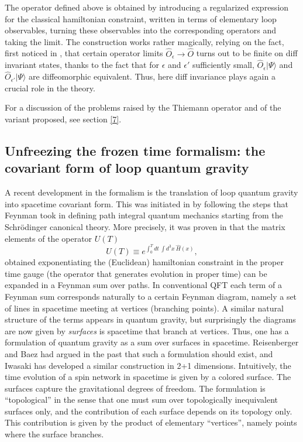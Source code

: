 \documentclass[12pt]{article}
\begin{document}
The operator defined above is obtained by introducing a 
regularized expression for the classical hamiltonian constraint, 
written in terms of elementary loop observables, turning these 
observables into the corresponding operators and taking the 
limit.  The construction works rather magically, relying on the 
fact, first noticed in \cite{RovelliSmolin94b}, that certain 
operator limits $\hat O_{\epsilon}\rightarrow \hat O$ turns out 
to be finite on diff invariant states, thanks to the fact that 
for $\epsilon$ and $\epsilon'$ sufficiently small, $\hat 
O_{\epsilon}|\Psi\rangle$ and $\hat O_{\epsilon'}|\Psi\rangle$ 
are diffeomorphic equivalent.  Thus, here diff invariance plays 
again a crucial role in the theory.

For a discussion of the problems raised by the Thiemann operator 
and of the variant proposed, see section \ref{7}. 


\subsection{Unfreezing the frozen time formalism: the 
covariant form of loop quantum gravity}\label{spacetime}

A recent development in the formalism is the translation 
of loop quantum gravity into spacetime covariant form.  This 
was initiated in \cite{RovelliSurf,ReisenbergerRovelli} by following 
the steps that Feynman took in defining path integral 
quantum mechanics starting from the Schr\"odinger canonical 
theory.  More precisely, it was proven in 
\cite{ReisenbergerRovelli} that the matrix elements of the 
operator $U(T)$ 
\begin{equation}
	U(T) \equiv e^{\int_{0}^{T}dt\ \int d^{3}x\ \hat H(x)}, 
\end{equation}
obtained exponentiating the (Euclidean) hamiltonian 
constraint in the proper time gauge (the operator that 
generates evolution in proper time) can be expanded in a 
Feynman sum over paths.  In conventional QFT each term of 
a Feynman sum corresponds naturally to a certain Feynman 
diagram, namely a set of lines in spacetime meeting at 
vertices (branching points).  A similar 
natural structure of the terms appears in quantum gravity, 
but surprisingly the diagrams are now given by {\em surfaces\/} is 
spacetime that branch at vertices.  Thus, one has a 
formulation of quantum gravity as a sum over surfaces in 
spacetime. Reisenberger \cite{Reisenberger94} and Baez 
\cite{Baez94b} had argued in the past that such a 
formulation should exist, and Iwasaki has developed a similar 
construction in 2+1 dimensions. Intuitively, the time evolution of a 
spin network in spacetime is given by a colored surface. 
 The surfaces capture the gravitational degrees 
of freedom.  The formulation is ``topological'' in the 
sense that one must sum over topologically inequivalent 
surfaces only, and the contribution of each surface 
depends on its topology only.  This contribution is given 
by the product of elementary ``vertices'', namely points 
where the surface branches. 
\end{document}
